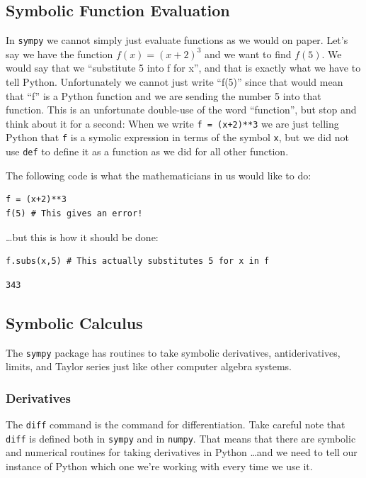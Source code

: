 \subsection{Symbolic Function Evaluation}
In \texttt{sympy} we cannot simply just evaluate functions as we would on paper.  Let's
say we have the function $f(x)= (x+2)^3$ and we want to find $f(5)$.  We would say that we
``substitute 5 into f for x'', and that is exactly what we have to tell Python.
Unfortunately we cannot just write ``f(5)'' since that would mean that ``f'' is a Python
function and we are sending the number 5 into that function.  This is an unfortunate
double-use of the word ``function'', but stop and think about it for a second: When we
write \texttt{f = (x+2)**3} we are just telling Python that \texttt{f} is a symolic
expression in terms of the symbol \texttt{x}, but we did not use \texttt{def} to define it
as a function as we did for all other function.

The following code is what the mathematicians in us would like to do:
\bcode
\begin{lstlisting}
f = (x+2)**3
f(5) # This gives an error!
\end{lstlisting}

\ldots but this is how it should be done:
\bcode
\begin{lstlisting}
f.subs(x,5) # This actually substitutes 5 for x in f
\end{lstlisting}
\boutput
\begin{lstlisting}
343
\end{lstlisting}


\subsection{Symbolic Calculus}
The \texttt{sympy} package has routines to take symbolic derivatives, antiderivatives,
limits, and Taylor series just like other computer algebra systems.  

\subsubsection{Derivatives}
The \texttt{diff} command is the command for differentiation.  
Take careful note that \texttt{diff} is defined both in \texttt{sympy} and in
\texttt{numpy}.  That means that there are symbolic and numerical routines for taking
derivatives in Python \ldots and we need to tell our instance of Python which one we're working with every time we use it.  


